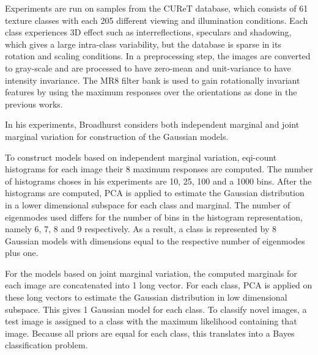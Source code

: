 Experiments are run on samples from the CUReT database, which consists of 61 texture classes with each 205 different viewing and illumination conditions. Each class experiences 3D effect such as interreflections, speculars and shadowing, which gives a large intra-class variability, but the database is sparse in its rotation and scaling conditions. In a preprocessing step, the images are converted to gray-scale and are processed to have zero-mean and unit-variance to have intensity invariance. The MR8 filter bank is used to gain rotationally invariant features by using the maximum responses over the orientations as done in the previous works.


In his experiments, Broadhurst considers both independent marginal and joint marginal variation for construction of the Gaussian models. 

To construct models based on independent marginal variation, eqi-count histograms for each image their 8 maximum responses are computed. The number of histograms choses in his experiments are 10, 25, 100 and a 1000 bins. After the histograms are computed, PCA is applied to estimate the Gaussian distribution in a lower dimensional subspace for each class and marginal. The number of eigenmodes used differs for the number of bins in the histogram representation, namely 6, 7, 8 and 9 respectively. As a result, a class is represented by 8 Gaussian models with dimensions equal to the respective number of eigenmodes plus one. 

For the models based on joint marginal variation, the computed marginals for each image are concatenated into 1 long vector. For each class, PCA is applied on these long vectors to estimate the Gaussian distribution in low dimensional subspace. This gives 1 Gaussian model for each class. To classify novel images, a test image is assigned to a class with the maximum likelihood containing that image. Because all priors are equal for each class, this translates into a Bayes classification problem.

